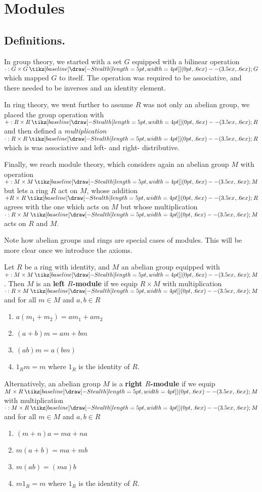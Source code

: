 \documentclass[12pt,letterpaper]{algebra_book}
\renewcommand{\to}{\mathbin{\tikz[baseline] \draw[-{Stealth[length=5pt,width=4pt]}] (0pt,.6ex) -- (3.5ex,.6ex);}}
\theoremstyle{definition}
\begin{document}
\begin{prf}
\begin{itemize}
    \end{itemize}
\end{prf}   

    
    \chapter{Modules}

\section{Definitions.}

In group theory, we started with a set $G$ equipped with a bilinear
operation $\cdot : G \times G \to G$ which mapped $G$ to itself.
The operation was required to be associative, and there needed to
be inverses and an identity element. 

In ring theory, we went further to assume $R$ was not only an
abelian group, we placed the group operation with $+: R\times R
\to R$ and then defined a \textit{multiplication} $\cdot: R \times
R \to R$ which is was associative and left- and right-
distributive.

Finally, we reach module theory, which considers again an abelian
group $M$ with operation $+:M \times M \to M$ but lets a ring $R$
act on $M$, whose addition $+R\times R \to R$ agrees with the one
which acts on $M$ but whose multiplication $\cdot: R \times M \to
M$ acts on $R$ and $M$. 

Note how abelian groups and rings are special cases of modules.
This will be more clear once we introduce the axioms. 

\begin{definition}
    Let $R$ be a ring with identity, and $M$ an abelian group
    equipped with $+:M \times M \to M$. Then $M$ is an
    \textbf{left $R$-module} if we equip $R \times M$ with
    multiplication $\cdot : R \times M \to M$ and for all $m \in
    M$ and $a, b \in R$
    \begin{enumerate}
        \item $a(m_1 + m_2)= am_1 + am_2$
        \item $(a + b)m = am + bm$
        \item $(ab)m = a(bm)$
        \item $1_Rm = m$ where $1_R$ is the identity of $R$.
    \end{enumerate} 

    Alternatively, an abelian group $M$ is a \textbf{right $R$-module} if we equip
    $M \times R \to M$ with multiplication $\cdot: M \times R \to
    M$ and for all $m \in M$ and $a, b \in R$
    \begin{enumerate}
        \item $(m + n)a = ma + na$ 
        \item $m(a + b) = ma + mb$
        \item $m(ab) = (ma)b$
        \item $m1_R = m$ where $1_R$ is the identity of $R$.
    \end{enumerate}
\end{definition}
\end{document}
